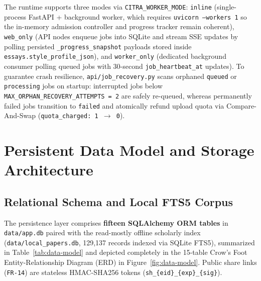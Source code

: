 The runtime supports three modes via \texttt{CITRA\_WORKER\_MODE}: \texttt{inline} (single-process FastAPI + background worker, which requires \texttt{uvicorn --workers 1} so the in-memory admission controller and progress tracker remain coherent), \texttt{web\_only} (API nodes enqueue jobs into SQLite and stream SSE updates by polling persisted \texttt{\_progress\_snapshot} payloads stored inside \texttt{essays.style\_profile\_json}), and \texttt{worker\_only} (dedicated background consumer polling queued jobs with 30-second \texttt{job\_heartbeat\_at} updates). To guarantee crash resilience, \texttt{api/job\_recovery.py} scans orphaned \texttt{queued} or \texttt{processing} jobs on startup: interrupted jobs below \texttt{MAX\_ORPHAN\_RECOVERY\_ATTEMPTS = 2} are safely re-queued, whereas permanently failed jobs transition to \texttt{failed} and atomically refund upload quota via Compare-And-Swap (\texttt{quota\_charged: 1 $\rightarrow$ 0}).

\section{Persistent Data Model and Storage Architecture}

\subsection{Relational Schema and Local FTS5 Corpus}

The persistence layer comprises \textbf{fifteen SQLAlchemy ORM tables} in \texttt{data/app.db} paired with the read-mostly offline scholarly index (\texttt{data/local\_papers.db}, 129,137 records indexed via SQLite FTS5), summarized in Table~\ref{tab:data-model} and depicted completely in the 15-table Crow's Foot Entity-Relationship Diagram (ERD) in Figure~\ref{fig:data-model}. Public share links (\texttt{FR-14}) are stateless HMAC-SHA256 tokens (\texttt{sh\_\{eid\}\_\{exp\}\_\{sig\}}).

